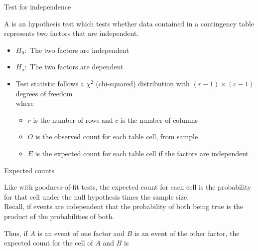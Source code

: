 \documentclass[xcolor=table, aspectratio=169, bigger]{beamer}
\begin{document}
\begin{frame}{Test for independence}
\begin{block}{}
A  is an hypothesis test which tests whether data contained in a contingency table represents two factors that are independent.
\begin{itemize}
\pause\item $H_0:$ The two factors are independent
\pause\item $H_a:$ The two factors are dependent\\
\pause\item Test statistic follows a $\chi^2$ (chi-squared) distribution with $(r-1) \times (c-1)$ degrees of freedom\\
\medskip
{}
\medskip
where
\begin{itemize}
\item $r$ is the number of rows and $c$ is the number of columns
\item $O$ is the observed count for each table cell, from sample
\item $E$ is the expected count for each table cell if the factors are independent
\end{itemize}
\end{itemize}
\end{block}
\end{frame}

\begin{frame}{Expected counts}
\begin{block}{}
Like with goodness-of-fit tests, the expected count for each cell is the probability for that cell under the null hypothesis times the sample size.\\
\medskip
{}
\pause\medskip
Recall, if events are independent that the probability of both being true is the product of the probabilities of both.\\
\medskip
{}

\pause\medskip
Thus, if $A$ is an event of one factor and $B$ is an event of the other factor, the expected count for the cell of $A$ and $B$ is\\
\medskip
{}
\medskip
\end{block}
\end{frame}
\end{document}

